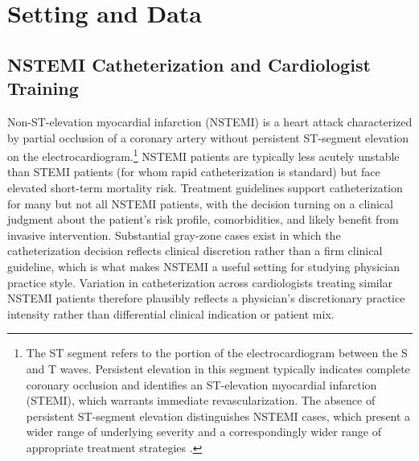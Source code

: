 \documentclass[12pt]{article}
\begin{document}
\section{Setting and Data}\label{sec:data}

\subsection{NSTEMI Catheterization and Cardiologist Training}

Non-ST-elevation myocardial infarction (NSTEMI) is a heart attack characterized by partial occlusion of a coronary artery without persistent ST-segment elevation on the electrocardiogram.\footnote{The ST segment refers to the portion of the electrocardiogram between the S and T waves. Persistent elevation in this segment typically indicates complete coronary occlusion and identifies an ST-elevation myocardial infarction (STEMI), which warrants immediate revascularization. The absence of persistent ST-segment elevation distinguishes NSTEMI cases, which present a wider range of underlying severity and a correspondingly wider range of appropriate treatment strategies \citep{amsterdam2014}.} NSTEMI patients are typically less acutely unstable than STEMI patients (for whom rapid catheterization is standard) but face elevated short-term mortality risk. Treatment guidelines support catheterization for many but not all NSTEMI patients, with the decision turning on a clinical judgment about the patient's risk profile, comorbidities, and likely benefit from invasive intervention. Substantial gray-zone cases exist in which the catheterization decision reflects clinical discretion rather than a firm clinical guideline, which is what makes NSTEMI a useful setting for studying physician practice style. Variation in catheterization across cardiologists treating similar NSTEMI patients therefore plausibly reflects a physician's discretionary practice intensity rather than differential clinical indication or patient mix.
\end{document}
